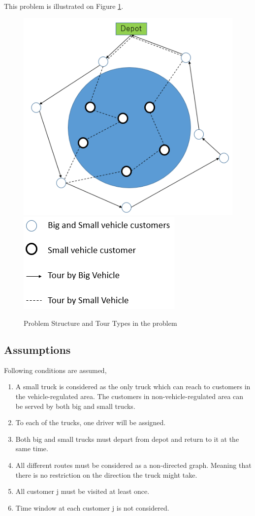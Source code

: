 \documentclass[dvipsnames,authoryear,11pt]{article}
\begin{document}
		This problem is illustrated on Figure \ref{fig:fig1}.
		
	\begin{figure}[h]
		\centering
		\includegraphics[width=0.6\linewidth]{figure}
		\includegraphics[width=0.3\linewidth]{legende}
		\caption{Problem Structure and Tour Types in the problem}
		\label{fig:fig1}
	\end{figure}
	
		
	
	\subsection{Assumptions}
	
	Following conditions are assumed,
	\begin{enumerate}
		\item	A small truck is considered as the only truck which can reach to customers in the vehicle-regulated area.
				The customers in non-vehicle-regulated area can be served by both big and small trucks.
		\item	To each of the trucks, one driver will be assigned.
		\item	Both big and small trucks must depart from depot and return to it at the same time. 
		\item	All different routes must be considered as a non-directed graph. Meaning that there is no restriction on the direction the truck might take.
		\item	All customer j must be visited at least once. 
		\item	Time window at each customer j is not considered.
	\end{enumerate}
	
\end{document}
